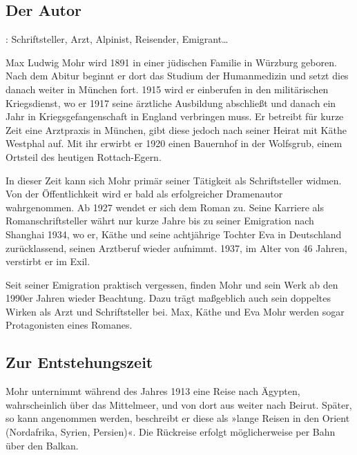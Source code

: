 \cleartooddpage
{}

\begin{small}

\subsection{Der Autor}

\buchautor{}: Schriftsteller, Arzt, Alpinist, Reisender, Emigrant…

Max Ludwig Mohr wird 1891 in einer jüdischen Familie in Würzburg geboren.
Nach dem Abitur beginnt er dort das Studium der Humanmedizin und setzt dies
danach weiter in München fort. 1915 wird er einberufen in den militärischen
Kriegsdienst, wo er 1917 seine ärztliche Ausbildung abschließt und danach ein
Jahr in Kriegsgefangenschaft in England verbringen muss.
Er betreibt für kurze Zeit eine Arztpraxis in München, gibt diese
jedoch nach seiner Heirat mit Käthe Westphal auf. Mit ihr erwirbt er 1920
einen Bauernhof in der Wolfsgrub, einem Ortsteil des heutigen
Rottach-Egern.

In dieser Zeit kann sich Mohr primär seiner Tätigkeit als Schriftsteller
widmen. Von der Öffentlichkeit wird er bald als erfolgreicher Dramenautor
wahrgenommen. Ab 1927 wendet er sich dem Roman zu. Seine Karriere als
Romanschriftsteller währt nur kurze Jahre bis zu seiner Emigration nach
Shanghai 1934, wo er, Käthe und seine achtjährige Tochter Eva in
Deutschland zurücklassend, seinen Arztberuf wieder aufnimmt. 1937, im Alter
von 46 Jahren, verstirbt er im Exil.%

Seit seiner Emigration praktisch vergessen, finden Mohr und
sein Werk ab den 1990er Jahren wieder Beachtung. Dazu trägt
maßgeblich auch sein doppeltes Wirken als Arzt und Schriftsteller bei.
Max, Käthe und Eva Mohr werden sogar Protagonisten
eines Romanes.

\subsection{Zur Entstehungszeit}

Mohr unternimmt während des Jahres 1913 eine Reise nach Ägypten,
wahrscheinlich über das Mittelmeer, und von dort aus weiter nach Beirut.
Später, so kann angenommen werden, beschreibt er diese
als »lange Reisen in den Orient (Nordafrika, Syrien, Persien)«.%
Die Rückreise erfolgt möglicherweise per Bahn über den Balkan.%


\end{small}
